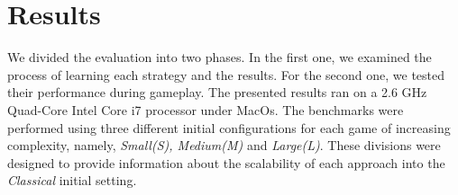 \section{Results}
\label{results}

We divided the evaluation into two phases. In the first one, we examined the process of learning each strategy and the results. For the second one, we tested their performance during gameplay. The presented results ran on a 2.6 GHz Quad-Core Intel Core i7 processor under MacOs. The benchmarks were performed using three different initial configurations for each game of increasing complexity, namely, \textit{Small(S), Medium(M)} and \textit{Large(L)}. These divisions were designed to provide information about the scalability of each approach into the \textit{Classical} initial setting.

